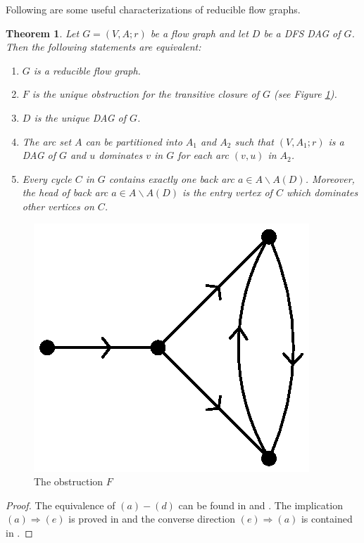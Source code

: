 \documentclass[11pt]{article}
\newtheorem{theorem}{Theorem}[section]
\begin{document}
Following are some useful characterizations of reducible flow graphs.
\begin{theorem}
\label{thm:1}
Let $G=(V,A;r)$ be a flow graph and let $D$ be a DFS DAG of $G$. Then the following statements are equivalent:
\begin{enumerate}[label=\emph{(}\alph*\emph{)}]
  \item $G$ is a reducible flow graph.
  \item $F$ is the unique obstruction for the transitive closure of $G$ (see Figure \ref{fig:1}).
  \item $D$ is the unique DAG of $G$.
  \item The arc set $A$ can be partitioned into $A_1$ and $A_2$ such that $(V,A_1;r)$ is a DAG of $G$ and $u$ dominates $v$ in $G$ for each arc $(v,u)$ in $A_2$.
  \item Every cycle $C$ in $G$ contains exactly one back arc $a\in A\backslash A(D)$. Moreover, the head of back arc $a\in A\backslash A(D)$ is the entry vertex of $C$ which dominates other vertices on $C$.
\end{enumerate}
\end{theorem}

\begin{figure}
\centering
\includegraphics[scale=.6]{FASPacking-fig1.eps}
\caption{The obstruction $F$}
\label{fig:1}
\end{figure}

\begin{proof}
The equivalence of $(a)-(d)$ can be found in \cite{HecU1} and \cite{HecU2}. The implication $(a)\Rightarrow (e)$ is proved in \cite{Sham} and the converse direction $(e)\Rightarrow (a)$ is contained in \cite{CheZ}.
\end{proof}
\end{document}
